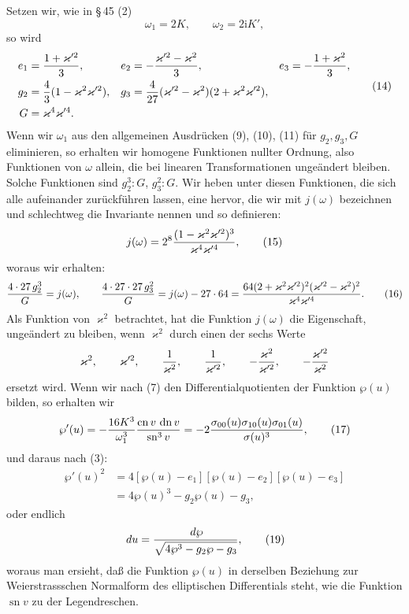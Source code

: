 \documentclass[11pt]{article}
\providecommand{\dd}{\,d}
\providecommand{\sn}{\operatorname{sn}}
\providecommand{\cn}{\operatorname{cn}}
\providecommand{\dn}{\operatorname{dn}}
\providecommand{\ii}{\mathrm{i}}
\begin{document}
Setzen wir, wie in \S\,45 (2)
\[
\omega_1=2K,
\qquad
\omega_2=2\ii K',
\]
so wird
\begin{equation}
\begin{aligned}
e_1&={1+\varkappa'^2\over3},&
 e_2&=-{\varkappa'^2-\varkappa^2\over3},&
 e_3&=-{1+\varkappa^2\over3},\\
g_2&={4\over3}(1-\varkappa^2\varkappa'^2),&
 g_3&={4\over27}(\varkappa'^2-\varkappa^2)(2+\varkappa^2\varkappa'^2),\\
G&=\varkappa^4\varkappa'^4.
\end{aligned}
\tag{14}
\end{equation}
Wenn wir $\omega_1$ aus den allgemeinen Ausdrücken (9), (10), (11) für $g_2,g_3,G$ eliminieren, so erhalten wir homogene Funktionen nullter Ordnung, also Funktionen von $\omega$ allein, die bei linearen Transformationen ungeändert bleiben. Solche Funktionen sind $g_2^3:G$, $g_3^2:G$. Wir heben unter diesen Funktionen, die sich alle aufeinander zurückführen lassen, eine hervor, die wir mit $j(\omega)$ bezeichnen und schlechtweg die Invariante nennen und so definieren:
\begin{equation}
j(\omega)=2^8{(1-\varkappa^2\varkappa'^2)^3\over\varkappa^4\varkappa'^4},
\tag{15}
\end{equation}
woraus wir erhalten:
\begin{equation}
{4\cdot27\,g_2^3\over G}=j(\omega),
\qquad
{4\cdot27\cdot27\,g_3^2\over G}=j(\omega)-27\cdot64
={64(2+\varkappa^2\varkappa'^2)^2(\varkappa'^2-\varkappa^2)^2\over\varkappa^4\varkappa'^4}.
\tag{16}
\end{equation}
Als Funktion von $\varkappa^2$ betrachtet, hat die Funktion $j(\omega)$ die Eigenschaft, ungeändert zu bleiben, wenn $\varkappa^2$ durch einen der sechs Werte
\[
\varkappa^2,
\qquad \varkappa'^2,
\qquad {1\over\varkappa^2},
\qquad {1\over\varkappa'^2},
\qquad -{\varkappa^2\over\varkappa'^2},
\qquad -{\varkappa'^2\over\varkappa^2}
\]
ersetzt wird.
Wenn wir nach (7) den Differentialquotienten der Funktion $\wp(u)$ bilden, so erhalten wir
\begin{equation}
\wp'(u)=-{16K^3\over\omega_1^3}{\cn v\,\dn v\over\sn^3v}
=-2{\sigma_{00}(u)\sigma_{10}(u)\sigma_{01}(u)\over\sigma(u)^3},
\tag{17}
\end{equation}
und daraus nach (3):
\begin{equation}
\begin{aligned}
\wp'(u)^2&=4[\wp(u)-e_1][\wp(u)-e_2][\wp(u)-e_3]\\
&=4\wp(u)^3-g_2\wp(u)-g_3,
\end{aligned}
\tag{18}
\end{equation}
oder endlich
\begin{equation}
\dd u={\dd\wp\over\sqrt{4\wp^3-g_2\wp-g_3}},
\tag{19}
\end{equation}
woraus man ersieht, daß die Funktion $\wp(u)$ in derselben Beziehung zur Weierstrassschen Normalform des elliptischen Differentials steht, wie die Funktion $\sn v$ zu der Legendreschen.
\end{document}
